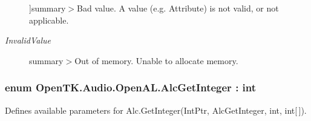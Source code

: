 \begin{Desc}
\begin{description}
{}]summary$>$Bad value. A value (e.\-g. Attribute) is not valid, or not applicable.\item[{\em 
\hypertarget{namespace_open_t_k_1_1_audio_1_1_open_a_l_a2684b7587fe0457a0203cacbdace7bc5a223e81e8afa42c41346a6696560ecc7b}{Invalid\-Value}\label{namespace_open_t_k_1_1_audio_1_1_open_a_l_a2684b7587fe0457a0203cacbdace7bc5a223e81e8afa42c41346a6696560ecc7b}
}]summary$>$Out of memory. Unable to allocate memory.\end{description}
\end{Desc}
\hypertarget{namespace_open_t_k_1_1_audio_1_1_open_a_l_ae26e71360702946aac46d8980c00d350}{
\subsubsection[{Alc\-Get\-Integer}]{\setlength{\rightskip}{0pt plus 5cm}enum {\bf Open\-T\-K.\-Audio.\-Open\-A\-L.\-Alc\-Get\-Integer} \-: int}}\label{namespace_open_t_k_1_1_audio_1_1_open_a_l_ae26e71360702946aac46d8980c00d350}


Defines available parameters for Alc.\-Get\-Integer(\-Int\-Ptr, Alc\-Get\-Integer, int, int\mbox{[}$\,$\mbox{]}). 

